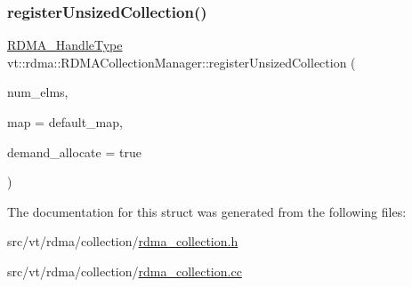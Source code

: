 \subsubsection{\texorpdfstring{register\+Unsized\+Collection()}{registerUnsizedCollection()}}
{\footnotesize\ttfamily \hyperlink{namespacevt_a10442579ec4e7ebef223818e64bcf908}{R\+D\+M\+A\+\_\+\+Handle\+Type} vt\+::rdma\+::\+R\+D\+M\+A\+Collection\+Manager\+::register\+Unsized\+Collection (\begin{DoxyParamCaption}\item[{\hyperlink{namespacevt_a2c2a902092b72056f70210c159f966f0}{R\+D\+M\+A\+\_\+\+Elm\+Type} const \&}]{num\+\_\+elms,  }\item[{\hyperlink{structvt_1_1rdma_1_1_r_d_m_a_manager_a16e12d11cf7d771df0d3dc6947a4f95c}{R\+D\+M\+A\+Manager\+::\+R\+D\+M\+A\+\_\+\+Map\+Type} const \&}]{map = {\ttfamily default\+\_\+map},  }\item[{bool const \&}]{demand\+\_\+allocate = {\ttfamily true} }\end{DoxyParamCaption})\hspace{0.3cm}{\ttfamily [static]}}



The documentation for this struct was generated from the following files\+:\begin{DoxyCompactItemize}
\item 
src/vt/rdma/collection/\hyperlink{rdma__collection_8h}{rdma\+\_\+collection.\+h}\item 
src/vt/rdma/collection/\hyperlink{rdma__collection_8cc}{rdma\+\_\+collection.\+cc}\end{DoxyCompactItemize}
